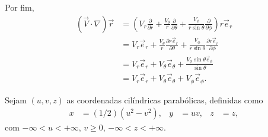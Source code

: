 \documentclass[a4paper,12pt, leqno, answers]{exam}
\newcommand{\devp}[2]{\frac{\partial #1}{\partial #2}}
\begin{document}
\begin{questions}
\begin{solution}
        Por fim,
        \begin{align*}
            \left( \vec{V} \cdot \nabla \right) \vec{r} &= \left( V_r \devp{}{r} + \frac{V_\theta}{r} \devp{}{\theta} + \frac{V_\phi}{r \sin \theta} \devp{}{\phi} \right) r \vec{e}_r \\
            &= V_r \vec{e}_r + \frac{V_\theta}{r} \devp{r \vec{e}_r}{\theta} + \frac{V_\phi}{r \sin \theta} \devp{r \vec{e}_r}{\phi} \\
            &= V_r \vec{e}_r + V_\theta \vec{e}_\theta + \frac{V_\phi \sin \theta \vec{e}_\phi}{\sin \theta} \\
            &= V_r \vec{e}_r + V_\theta \vec{e}_\theta + V_\phi \vec{e}_\phi.
        \end{align*}
    \end{solution}

    \question[T1 de 2011] Sejam $(u, v, z)$ as coordenadas cil\'{i}ndricas parab\'{o}licas, definidas como
    \begin{align*}
        x &= (1/2)(u^2 - v^2), & y &= uv, & z &= z,
    \end{align*}
    com $-\infty < u < +\infty$, $v \geq 0$, $-\infty < z < +\infty$.
    \begin{parts}

\end{parts}
\end{questions}
\end{document}
